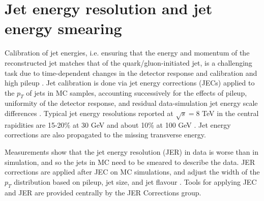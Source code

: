 \section{Jet energy resolution and jet energy smearing}
Calibration of jet energies, i.e. ensuring that the energy and momentum of the reconstructed jet matches that of the quark/gluon-initiated jet, is a challenging task due to time-dependent changes in the detector response and calibration and high pileup \cite{CMS-JME-13-004} \cite{proceedings-Agarwal:2022txa}. Jet calibration is done via jet energy corrections (JECs) applied to the $p_{T}$ of jets in MC samples, accounting successively for the effects of pileup, uniformity of the detector response, and residual data-simulation jet energy scale differences \cite{twiki_JetResolution_JEC}. Typical jet energy resolutions reported at $\sqrt{s} = 8$ TeV in the central rapidities are 15-20\% at 30 GeV and about 10\% at 100 GeV \cite{CMS-JME-13-004}. Jet energy corrections are also propagated to the missing transverse energy.

Measurements show that the jet energy resolution (JER) in data is worse than in simulation, and so the jets in MC need to be smeared to describe the data. JER corrections are applied after JEC on MC simulations, and adjust the width of the $p_{T}$ distribution based on pileup, jet size, and jet flavour \cite{twiki_JetResolution_JER}. Tools for applying JEC and JER are provided centrally by the JER Corrections group. 